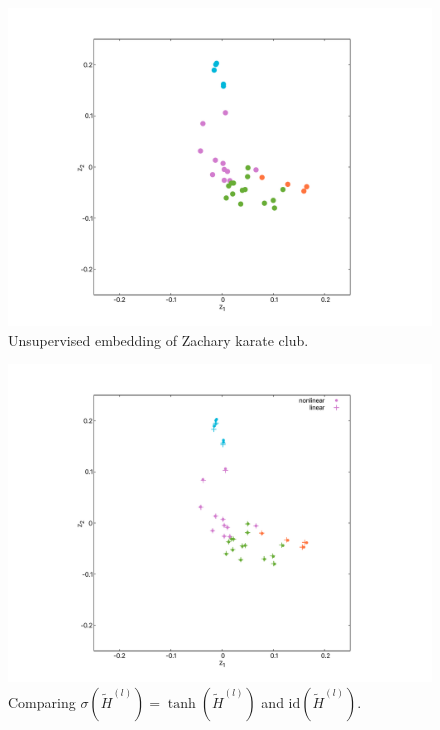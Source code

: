 \documentclass[mathserif,10pt]{beamer}
\begin{document}
\begin{frame}
  \begin{figure}
    \includegraphics[scale=0.25]{figs/fig01b.pdf}
    \caption{Unsupervised embedding of Zachary karate club.}
  \end{figure}
\end{frame}

\begin{frame}
  \begin{figure}
    \includegraphics[scale=0.25]{figs/fig01c.pdf}
    \caption{Comparing $\sigma(\tilde{H}^{(l)}) = \tanh(\tilde{H}^{(l)})$ and $\text{id}(\tilde{H}^{(l)})$.}
  \end{figure}
\end{frame}
\end{document}
